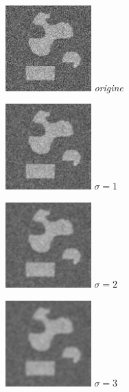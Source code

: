 \documentclass[a4,12pt]{article}
\begin{document}
\noindent
\begin{minipage}[c]{0.20\linewidth}
	\begin{center}
		\includegraphics[width = 33mm]{./img/formes2bb50.jpg}
		\textit{origine}
	\end{center}
\end{minipage}
\begin{minipage}[c]{0.20\linewidth}
	\begin{center}
		\includegraphics[width = 33mm]{./img/2bb50-1.jpg}
		\textit{$\sigma = 1$}
	\end{center}
\end{minipage}
\begin{minipage}[c]{0.20\linewidth}
	\begin{center}
		\includegraphics[width = 33mm]{./img/2bb50-2.jpg}
		\textit{$\sigma = 2$}
	\end{center}
\end{minipage}
\begin{minipage}[c]{0.20\linewidth}
	\begin{center}
		\includegraphics[width = 33mm]{./img/2bb50-3.jpg}
		\textit{$\sigma = 3$}
	\end{center}
\end{minipage}
\end{document}
